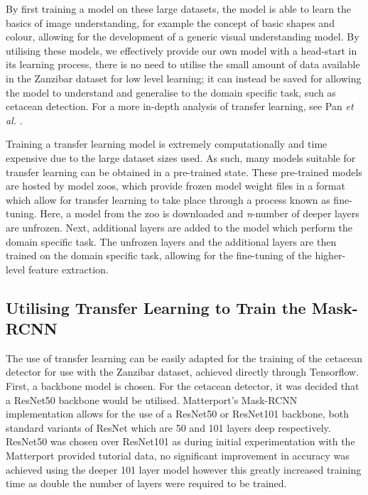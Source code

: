 By first training a model on these large datasets, the model is able to learn the basics of image understanding, for example the concept of basic shapes and colour, allowing for the development of a generic visual understanding model. By utilising these models, we effectively provide our own model with a head-start in its learning process, there is no need to utilise the small amount of data available in the Zanzibar dataset for low level learning; it can instead be saved for allowing the model to understand and generalise to the domain specific task, such as cetacean detection. For a more in-depth analysis of transfer learning, see Pan \textit{et al.} \cite{pan_survey_2010}.

Training a transfer learning model is extremely computationally and time expensive due to the large dataset sizes used. As such, many models suitable for transfer learning can be obtained in a pre-trained state. These pre-trained models are hosted by model zoos, which provide frozen model weight files in a format which allow for transfer learning to take place through a process known as fine-tuning. Here, a model from the zoo is downloaded and \textit{n}-number of deeper layers are unfrozen. Next, additional layers are added to the model which perform the domain specific task. The unfrozen layers and the additional layers are then trained on the domain specific task, allowing for the fine-tuning of the higher-level feature extraction. 

\subsection{Utilising Transfer Learning to Train the Mask-RCNN}\label{ch:cetDet,sec:initialTesting,sub:transferLearningforTheDetector}

The use of transfer learning can be easily adapted for the training of the cetacean detector for use with the Zanzibar dataset, achieved directly through Tensorflow. First, a backbone model is chosen. For the cetacean detector, it was decided that a ResNet50 backbone would be utilised. Matterport's Mask-RCNN implementation allows for the use of a ResNet50 or ResNet101 backbone, both standard variants of ResNet which are 50 and 101 layers deep respectively. ResNet50 was chosen over ResNet101 as during initial experimentation with the Matterport provided tutorial data, no significant improvement in accuracy was achieved using the deeper 101 layer model however this greatly increased training time as double the number of layers were required to be trained. 

